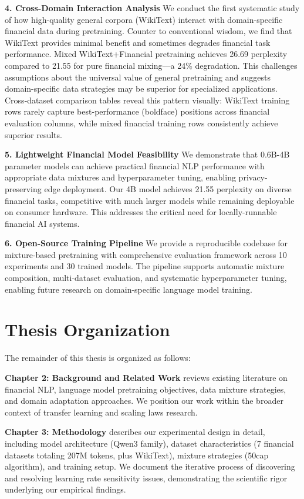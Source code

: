 \textbf{4. Cross-Domain Interaction Analysis}
We conduct the first systematic study of how high-quality general corpora (WikiText) interact with domain-specific financial data during pretraining. Counter to conventional wisdom, we find that WikiText provides minimal benefit and sometimes degrades financial task performance. Mixed WikiText+Financial pretraining achieves 26.69 perplexity compared to 21.55 for pure financial mixing—a 24\% degradation. This challenges assumptions about the universal value of general pretraining and suggests domain-specific data strategies may be superior for specialized applications. Cross-dataset comparison tables reveal this pattern visually: WikiText training rows rarely capture best-performance (boldface) positions across financial evaluation columns, while mixed financial training rows consistently achieve superior results.

\textbf{5. Lightweight Financial Model Feasibility}
We demonstrate that 0.6B-4B parameter models can achieve practical financial NLP performance with appropriate data mixtures and hyperparameter tuning, enabling privacy-preserving edge deployment. Our 4B model achieves 21.55 perplexity on diverse financial tasks, competitive with much larger models while remaining deployable on consumer hardware. This addresses the critical need for locally-runnable financial AI systems.

\textbf{6. Open-Source Training Pipeline}
We provide a reproducible codebase for mixture-based pretraining with comprehensive evaluation framework across 10 experiments and 30 trained models. The pipeline supports automatic mixture composition, multi-dataset evaluation, and systematic hyperparameter tuning, enabling future research on domain-specific language model training.

\section{Thesis Organization}

The remainder of this thesis is organized as follows:

\textbf{Chapter 2: Background and Related Work} reviews existing literature on financial NLP, language model pretraining objectives, data mixture strategies, and domain adaptation approaches. We position our work within the broader context of transfer learning and scaling laws research.

\textbf{Chapter 3: Methodology} describes our experimental design in detail, including model architecture (Qwen3 family), dataset characteristics (7 financial datasets totaling 207M tokens, plus WikiText), mixture strategies (50cap algorithm), and training setup. We document the iterative process of discovering and resolving learning rate sensitivity issues, demonstrating the scientific rigor underlying our empirical findings.

